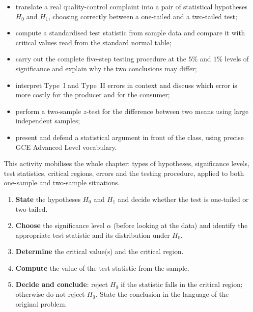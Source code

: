 \documentclass[11pt]{article}
\newcounter{popsec}
\newcounter{popsub}
\newcommand{\courssub}[1]{%
  \stepcounter{popsub}%
  \par\vspace{9pt}\noindent{\popxbold\fontsize{11.5}{13}\selectfont\color{popink}{\color{poporange}\thepopsec.\thepopsub}\hspace{6pt}#1}\par\nopagebreak\vspace{4pt}
}
\begin{document}
\begin{itemize}
\item translate a real quality-control complaint into a pair of statistical hypotheses $H_0$ and $H_1$, choosing correctly between a one-tailed and a two-tailed test;
\item compute a standardised test statistic from sample data and compare it with critical values read from the standard normal table;
\item carry out the complete five-step testing procedure at the $5\%$ and $1\%$ levels of significance and explain why the two conclusions may differ;
\item interpret Type~I and Type~II errors in context and discuss which error is more costly for the producer and for the consumer;
\item perform a two-sample $z$-test for the difference between two means using large independent samples;
\item present and defend a statistical argument in front of the class, using precise GCE Advanced Level vocabulary.
\end{itemize}

This activity mobilises the whole chapter: types of hypotheses, significance levels, test statistics, critical regions, errors and the testing procedure, applied to both one-sample and two-sample situations.

\begin{aretenir}
\begin{enumerate}
\item \textbf{State} the hypotheses $H_0$ and $H_1$ and decide whether the test is one-tailed or two-tailed.
\item \textbf{Choose} the significance level $\alpha$ (before looking at the data) and identify the appropriate test statistic and its distribution under $H_0$.
\item \textbf{Determine} the critical value(s) and the critical region.
\item \textbf{Compute} the value of the test statistic from the sample.
\item \textbf{Decide and conclude}: reject $H_0$ if the statistic falls in the critical region; otherwise do not reject $H_0$. State the conclusion in the language of the original problem.
\end{enumerate}
\end{aretenir}

\courssub{Situation}
\end{document}
